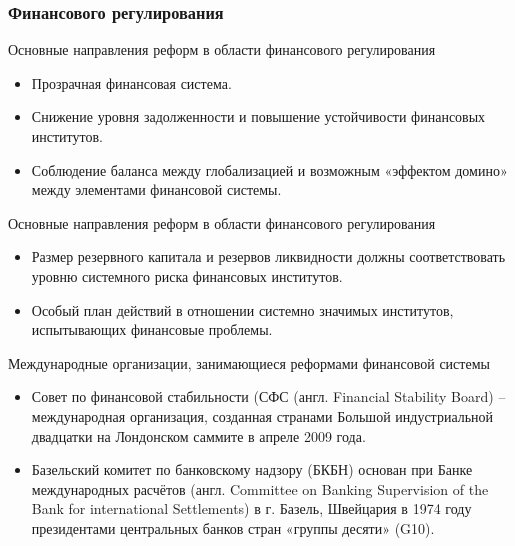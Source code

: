 \documentclass[_Banking_p1.tex]{subfiles}
\begin{document}
\subsubsection{Финансового регулирования}
\begin{frame}{\setfontsize{12pt} Основные направления реформ в области финансового регулирования}
\begin{itemize}[<+->]
\item
Прозрачная финансовая система.

\item
Снижение уровня задолженности и повышение устойчивости финансовых институтов.

\item
Соблюдение баланса между глобализацией и возможным «эффектом домино» между элементами финансовой системы.
\end{itemize}

\end{frame}
\begin{frame}{\setfontsize{12pt} Основные направления реформ в области финансового регулирования}
\begin{itemize}[<+->]
\item
Размер резервного капитала и резервов ликвидности должны соответствовать уровню системного риска финансовых институтов.

\item
Особый план действий в отношении системно значимых институтов, испытывающих финансовые проблемы.
\end{itemize}

\end{frame}

\begin{frame}{\setfontsize{14pt} Международные организации, занимающиеся реформами финансовой системы}
\begin{itemize}[<+->]
\item
Совет по финансовой стабильности (СФС (англ. Financial Stability Board) – международная организация, созданная странами Большой индустриальной двадцатки на Лондонском саммите в апреле 2009 года.

\item
Базельский комитет по банковскому надзору (БКБН) основан при Банке международных расчётов (англ. Committee on Banking Supervision of the Bank for international Settlements) в г. Базель, Швейцария в 1974 году президентами центральных банков стран «группы десяти» (G10).
\end{itemize}

\end{frame}
\end{document}
